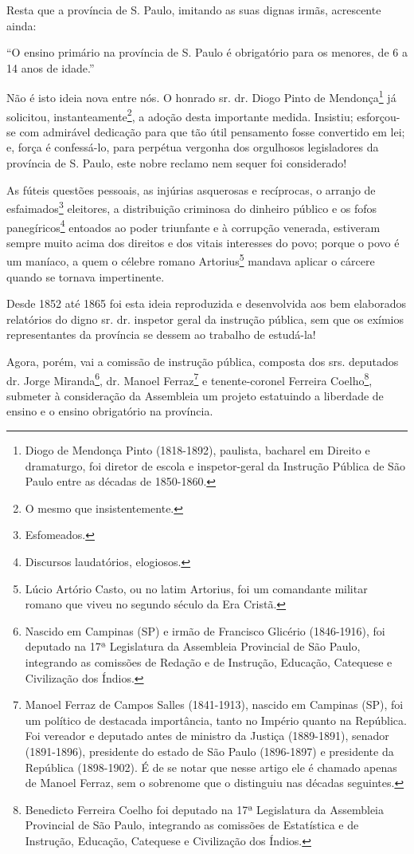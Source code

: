 Resta que a província de S. Paulo, imitando as suas dignas irmãs,
acrescente ainda:

``O ensino primário na província de S. Paulo é obrigatório para os
menores, de 6 a 14 anos de idade.''

Não é isto ideia nova entre nós. O honrado sr. dr. Diogo Pinto de
Mendonça\footnote{Diogo de Mendonça Pinto (1818-1892), paulista,
  bacharel em Direito e dramaturgo, foi diretor de escola e
  inspetor-geral da Instrução Pública de São Paulo entre as décadas de
  1850-1860.} já solicitou, instanteamente\footnote{O mesmo que
  insistentemente.}, a adoção desta importante medida. Insistiu;
esforçou-se com admirável dedicação para que tão útil pensamento fosse
convertido em lei; e, força é confessá-lo, para perpétua vergonha dos
orgulhosos legisladores da província de S. Paulo, este nobre reclamo nem
sequer foi considerado!

As fúteis questões pessoais, as injúrias asquerosas e recíprocas, o
arranjo de esfaimados\footnote{Esfomeados.} eleitores, a distribuição
criminosa do dinheiro público e os fofos panegíricos\footnote{
  Discursos laudatórios, elogiosos.} entoados ao poder triunfante e à
corrupção venerada, estiveram sempre muito acima dos direitos e dos
vitais interesses do povo; porque o povo é um maníaco, a quem o célebre
romano Artorius\footnote{Lúcio Artório Casto, ou no latim Artorius,
  foi um comandante militar romano que viveu no segundo século da Era
  Cristã.} mandava aplicar o cárcere quando se tornava impertinente.

Desde 1852 até 1865 foi esta ideia reproduzida e desenvolvida aos bem
elaborados relatórios do digno sr. dr. inspetor geral da instrução
pública, sem que os exímios representantes da província se dessem ao
trabalho de estudá-la!

Agora, porém, vai a comissão de instrução pública, composta dos srs.
deputados dr. Jorge Miranda\footnote{Nascido em Campinas (SP) e irmão
  de Francisco Glicério (1846-1916), foi deputado na 17ª Legislatura da
  Assembleia Provincial de São Paulo, integrando as comissões de Redação
  e de Instrução, Educação, Catequese e Civilização dos Índios.}, dr.
Manoel Ferraz\footnote{Manoel Ferraz de Campos Salles (1841-1913),
  nascido em Campinas (SP), foi um político de destacada importância,
  tanto no Império quanto na República. Foi vereador e deputado antes de
  ministro da Justiça (1889-1891), senador (1891-1896), presidente do
  estado de São Paulo (1896-1897) e presidente da República (1898-1902).
  É de se notar que nesse artigo ele é chamado apenas de Manoel Ferraz,
  sem o sobrenome que o distinguiu nas décadas seguintes.} e
tenente-coronel Ferreira Coelho\footnote{Benedicto Ferreira Coelho foi
  deputado na 17ª Legislatura da Assembleia Provincial de São Paulo,
  integrando as comissões de Estatística e de Instrução, Educação,
  Catequese e Civilização dos Índios.}, submeter à consideração da
Assembleia um projeto estatuindo a liberdade de ensino e o ensino
obrigatório na província.

